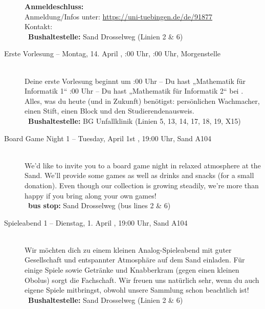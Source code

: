 \begin{description}
    \textbf{Anmeldeschluss:} \matheanmeldung\YEAR\\
    Anmeldung/Infos unter: \url{https://uni-tuebingen.de/de/91877}\\
    Kontakt: \texttt{\mathkontakt}
    \ifsommersemester
        \\ ~\textbf{Bushaltestelle:} Sand Drosselweg (Linien 2 \& 6)
    \fi
\fi


\ifbachelor
    \item[Erste Vorlesung -- Montag, 14. April \YEAR, \ifwintersemester 8:00 Uhr, \else 10:00 Uhr, \fi Morgenstelle]~\\
    Deine erste Vorlesung beginnt um
    :00 Uhr -- Du hast „Mathematik für Informatik 1“  \fi
    :00 Uhr -- Du hast „Mathematik für Informatik 2“  \fi
    bei \Matheprof.
    Alles, was du heute (und in Zukunft) benötigst: persönlichen Wachmacher, einen Stift, einen Block und den Studierendenausweis.\\
    ~\textbf{Bushaltestelle:} BG Unfallklinik (Linien 5, 13, 14, 17, 18, 19, X15)
\fi

\ifml
    \item[Board Game Night 1 -- Tuesday, April 1st \YEAR, 19:00 Uhr, Sand A104]~\\%
    We'd like to invite you to a board game night in relaxed atmosphere at the Sand.
    We'll provide some games as well as drinks and snacks (for a small donation).
    Even though our collection is growing steadily, we're more than happy if you bring along your own games!\\
    ~\textbf{bus stop:} Sand Drosselweg (bus lines 2 \& 6)
\else
    \item[Spieleabend 1 -- Dienstag, 1. April \YEAR, 19:00 Uhr, Sand A104]~\\%
    Wir möchten dich zu einem kleinen Analog-Spieleabend mit guter Gesellschaft und entspannter Atmosphäre auf dem Sand einladen.
    Für einige Spiele sowie Getränke und Knabberkram (gegen einen kleinen Obolus) sorgt die Fachschaft.
    Wir freuen uns natürlich sehr, wenn du auch eigene Spiele mitbringst, obwohl unsere Sammlung schon beachtlich ist!\\
    ~\textbf{Bushaltestelle:} Sand Drosselweg (Linien 2 \& 6)
\fi


\end{description}
